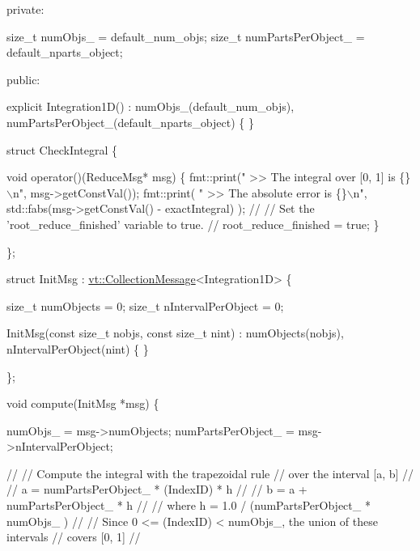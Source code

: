 \begin{DoxyCodeInclude}
\textcolor{keyword}{private}:

  \textcolor{keywordtype}{size\_t} numObjs\_ = default\_num\_objs;
  \textcolor{keywordtype}{size\_t} numPartsPerObject\_ = default\_nparts\_object;

\textcolor{keyword}{public}:

  \textcolor{keyword}{explicit} Integration1D()
    : numObjs\_(default\_num\_objs),
      numPartsPerObject\_(default\_nparts\_object)
  \{ \}

  \textcolor{keyword}{struct }CheckIntegral \{

    \textcolor{keywordtype}{void} operator()(ReduceMsg* msg) \{
      fmt::print(\textcolor{stringliteral}{" >> The integral over [0, 1] is \{\}\(\backslash\)n"}, msg->getConstVal());
      fmt::print(
        \textcolor{stringliteral}{" >> The absolute error is \{\}\(\backslash\)n"},
        std::fabs(msg->getConstVal() - exactIntegral)
      );
      \textcolor{comment}{//}
      \textcolor{comment}{// Set the 'root\_reduce\_finished' variable to true.}
      \textcolor{comment}{//}
      root\_reduce\_finished = \textcolor{keyword}{true};
    \}

  \};

  \textcolor{keyword}{struct }InitMsg : \hyperlink{structvt_1_1vrt_1_1collection_1_1_collection_message}{vt::CollectionMessage}<Integration1D> \{

    \textcolor{keywordtype}{size\_t} numObjects = 0;
    \textcolor{keywordtype}{size\_t} nIntervalPerObject = 0;

    InitMsg(\textcolor{keyword}{const} \textcolor{keywordtype}{size\_t} nobjs, \textcolor{keyword}{const} \textcolor{keywordtype}{size\_t} nint)
      : numObjects(nobjs), nIntervalPerObject(nint)
    \{ \}

  \};

  \textcolor{keywordtype}{void} compute(InitMsg *msg) \{

    numObjs\_ = msg->numObjects;
    numPartsPerObject\_ = msg->nIntervalPerObject;

    \textcolor{comment}{//}
    \textcolor{comment}{// Compute the integral with the trapezoidal rule}
    \textcolor{comment}{// over the interval [a, b]}
    \textcolor{comment}{//}
    \textcolor{comment}{// a = numPartsPerObject\_ * (IndexID) * h}
    \textcolor{comment}{//}
    \textcolor{comment}{// b = a + numPartsPerObject\_ * h}
    \textcolor{comment}{//}
    \textcolor{comment}{// where h = 1.0 / (numPartsPerObject\_ * numObjs\_ )}
    \textcolor{comment}{//}
    \textcolor{comment}{// Since 0 <= (IndexID) < numObjs\_, the union of these intervals}
    \textcolor{comment}{// covers [0, 1]}
    \textcolor{comment}{//}


\end{DoxyCodeInclude}
